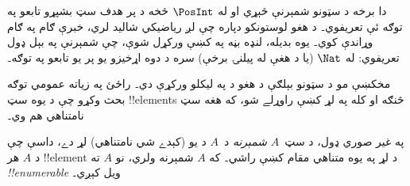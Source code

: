 \documentclass[../../../include/open-logic-section]{subfiles}
\begin{document}


\begin{editorial}
  دا برخه د سټونو شمېرنې څېړي او له $\PosInt$ څخه د پر هدف سټ
  بشپړو تابعو په توګه ئې تعريفوي۔ د هغو لوستونکو دپاره چې
  لږ رياضيکي شاليد لري، خبرې ګام په ګام وړاندې کوي۔ يوه
  بديله، لنډه بڼه په  کښې ورکړل شوې، چې
  شمېرنې په بېل ډول تعريفوي: له $\Nat$ (يا د هغې له پيلنۍ
  برخې) سره د دوه اړخيزو يو پر يو تابعو په توګه۔
\end{editorial}

\begin{explain}
مخکښې مو د سټونو بېلګې د هغو د  په
ليکلو ورکړې دي۔ راځئ په زياته عمومي توګه بحث وکړو چې د يوه
سټ !!{element}s څنګه او کله په لړ کښې راوړلے شو، که هغه سټ
نامتناهي هم وي۔
\end{explain}

\begin{defn}
په غير صوري ډول، د سټ~$A$ \emph{شمېرنه} د~$A$ د
 يو (کېدے شي نامتناهي) لړ دے، داسې چې د $A$
هر !!{element} د لړ په يوه متناهي مقام کښې راشي۔ که $A$ شمېرنه
ولري، نو $A$ ته \emph{!!{enumerable}} ويل کېږي۔
\end{defn}
\end{document}
